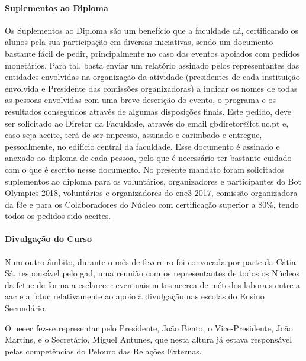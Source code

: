 \paragraph{Suplementos ao Diploma}
Os Suplementos ao Diploma são um benefício que a faculdade dá, certificando os alunos pela sua participação em diversas iniciativas, sendo um documento bastante fácil de pedir, principalmente no caso dos eventos apoiados com pedidos monetários. Para tal, basta enviar um relatório assinado pelos representantes das entidades envolvidas na organização da atividade (presidentes de cada instituição envolvida e Presidente das comissões organizadoras) a indicar os nomes de todas as pessoas envolvidas com uma breve descrição do evento, o programa e os resultados conseguidos através de algumas disposições finais. Este pedido, deve ser solicitado ao Diretor da Faculdade, através do email gbdiretor@fct.uc.pt e, caso seja aceite, terá de ser impresso, assinado e carimbado e entregue, pessoalmente, no edifício central da faculdade. Esse documento é assinado e anexado ao diploma de cada pessoa, pelo que é necessário ter bastante cuidado com o que é escrito nesse documento. No presente mandato foram solicitados suplementos ao diploma para os voluntários, organizadores e participantes do Bot Olympics 2018, voluntários e organizadores do \acrshort{ene3} 2017, comissão organizadora da \acrshort{f3e} e para os Colaboradores do Núcleo com certificação superior a 80\%, tendo todos os pedidos sido aceites.

\paragraph{Divulgação do Curso}

Num outro âmbito, durante o mês de fevereiro foi convocada por parte da Cátia Sá, responsável pelo \acrfull{gad}, uma reunião com os representantes de todos os Núcleos da \acrshort{fctuc} de forma a esclarecer eventuais mitos acerca de métodos laborais entre a \acrshort{aac} e a \acrshort{fctuc} relativamente ao apoio à divulgação nas escolas do Ensino Secundário.

O \acrshort{neeec} fez-se representar pelo Presidente, João Bento, o Vice-Presidente, João Martins, e o Secretário, Miguel Antunes, que nesta altura já estava responsável pelas competências do Pelouro das Relações Externas.

